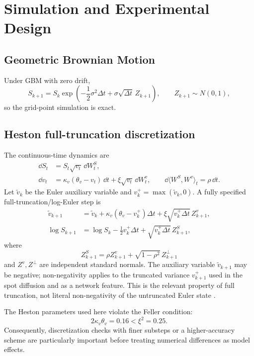 \section{Simulation and Experimental Design}
\label{sec:design}

\subsection{Geometric Brownian Motion}

Under GBM with zero drift,
\[
  S_{k+1}=S_k
  \exp\!\left(-\frac{1}{2}\sigma^2\Delta t
  +\sigma\sqrt{\Delta t}\,Z_{k+1}\right),
  \qquad Z_{k+1}\sim N(0,1),
\]
so the grid-point simulation is exact.

\subsection{Heston full-truncation discretization}

The continuous-time dynamics are
\begin{align}
  \dd S_t&=S_t\sqrt{v_t}\,\dd W_t^S,\\
  \dd v_t&=\kappa_v(\theta_v-v_t)\,\dd t
  +\xi\sqrt{v_t}\,\dd W_t^v,
  \qquad \dd\langle W^S,W^v\rangle_t=\rho\,\dd t.
\end{align}
Let $\widetilde v_k$ be the Euler auxiliary variable and
$v_k^+=\max(\widetilde v_k,0)$. A fully specified full-truncation/log-Euler
step is
\begin{align}
  \widetilde v_{k+1}
  &=\widetilde v_k
  +\kappa_v(\theta_v-v_k^+)\Delta t
  +\xi\sqrt{v_k^+\Delta t}\,Z_{k+1}^{v},
  \label{eq:heston_v}\\
  \log S_{k+1}
  &=\log S_k-\frac{1}{2}v_k^+\Delta t
  +\sqrt{v_k^+\Delta t}\,Z_{k+1}^{S},
  \label{eq:heston_s}
\end{align}
where
\[
  Z_{k+1}^{S}=\rho Z_{k+1}^{v}
  +\sqrt{1-\rho^2}\,Z_{k+1}^{\perp}
\]
and $Z^v,Z^{\perp}$ are independent standard normals. The auxiliary variable
$\widetilde v_{k+1}$ may be negative; non-negativity applies to the truncated
variance $v_{k+1}^+$ used in the spot diffusion and as a network feature. This
is the relevant property of full truncation, not literal non-negativity of the
untruncated Euler state \citep{lord2010}.

The Heston parameters used here violate the Feller condition:
\[
  2\kappa_v\theta_v=0.16<\xi^2=0.25.
\]
Consequently, discretization checks with finer substeps or a higher-accuracy
scheme are particularly important before treating numerical differences as
model effects.


